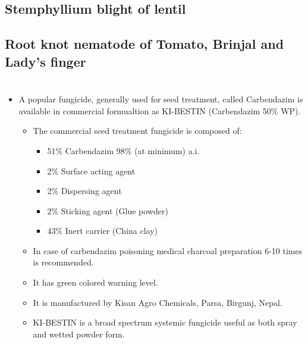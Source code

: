 \documentclass[
  openany]{book}
\providecommand{\tightlist}{%
  \setlength{\itemsep}{0pt}\setlength{\parskip}{0pt}}
\begin{document}
\hypertarget{stemphyllium-blight-of-lentil}{%
\subsection{Stemphyllium blight of lentil}\label{stemphyllium-blight-of-lentil}}

\hypertarget{root-knot-nematode-of-tomato-brinjal-and-ladys-finger}{%
\subsection{Root knot nematode of Tomato, Brinjal and Lady's finger}\label{root-knot-nematode-of-tomato-brinjal-and-ladys-finger}}

\hypertarget{section}{%
\section{}\label{section}}

\begin{itemize}
\tightlist
\item
  A popular fungicide, generally used for seed treatment, called Carbendazim is available in commercial formualtion as KI-BESTIN (Carbendazim 50\% WP).

  \begin{itemize}
  \tightlist
  \item
    The commercial seed treatment fungicide is composed of:

    \begin{itemize}
    \tightlist
    \item
      51\% Carbendazim 98\% (at minimum) a.i.
    \item
      2\% Surface acting agent
    \item
      2\% Dispersing agent
    \item
      2\% Sticking agent (Glue powder)
    \item
      43\% Inert carrier (China clay)
    \end{itemize}
  \item
    In case of carbendazim poisoning medical charcoal preparation 6-10 times is recommended.
  \item
    It has green colored warning level.
  \item
    It is manufactured by Kisan Agro Chemicals, Parsa, Birgunj, Nepal.
  \item
    KI-BESTIN is a broad spectrum systemic fungicide useful as both spray and wetted powder form.
  \end{itemize}
\end{itemize}
\end{document}
